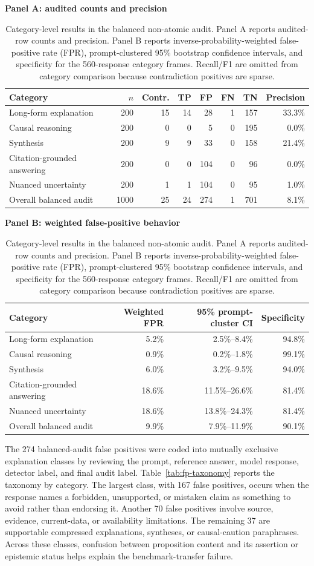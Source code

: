 \documentclass[11pt]{article}
\begin{document}
\begin{table}[H]
\centering
\small
\caption{Category-level results in the balanced non-atomic audit. Panel A reports audited-row counts and precision. Panel B reports inverse-probability-weighted false-positive rate (FPR), prompt-clustered 95\% bootstrap confidence intervals, and specificity for the 560-response category frames. Recall/F1 are omitted from category comparison because contradiction positives are sparse.}
\label{tab:enhanced-category-breakdown}
\textbf{Panel A: audited counts and precision}\\[0.25em]
\begin{tabular}{lrrrrrrr}
\toprule
Category & $n$ & Contr. & TP & FP & FN & TN & Precision\\
\midrule
Long-form explanation & 200 & 15 & 14 & 28 & 1 & 157 & 33.3\%\\
Causal reasoning & 200 & 0 & 0 & 5 & 0 & 195 & 0.0\%\\
Synthesis & 200 & 9 & 9 & 33 & 0 & 158 & 21.4\%\\
Citation-grounded answering & 200 & 0 & 0 & 104 & 0 & 96 & 0.0\%\\
Nuanced uncertainty & 200 & 1 & 1 & 104 & 0 & 95 & 1.0\%\\
\midrule
Overall balanced audit & 1000 & 25 & 24 & 274 & 1 & 701 & 8.1\%\\
\bottomrule
\end{tabular}

\vspace{0.6em}
\textbf{Panel B: weighted false-positive behavior}\\[0.25em]
\begin{tabular}{lrrr}
\toprule
Category & Weighted FPR & 95\% prompt-cluster CI & Specificity\\
\midrule
Long-form explanation & 5.2\% & 2.5\%--8.4\% & 94.8\%\\
Causal reasoning & 0.9\% & 0.2\%--1.8\% & 99.1\%\\
Synthesis & 6.0\% & 3.2\%--9.5\% & 94.0\%\\
Citation-grounded answering & 18.6\% & 11.5\%--26.6\% & 81.4\%\\
Nuanced uncertainty & 18.6\% & 13.8\%--24.3\% & 81.4\%\\
\midrule
Overall balanced audit & 9.9\% & 7.9\%--11.9\% & 90.1\%\\
\bottomrule
\end{tabular}
\end{table}

The 274 balanced-audit false positives were coded into mutually exclusive explanation classes by reviewing the prompt, reference answer, model response, detector label, and final audit label. Table~\ref{tab:fp-taxonomy} reports the taxonomy by category. The largest class, with 167 false positives, occurs when the response names a forbidden, unsupported, or mistaken claim as something to avoid rather than endorsing it. Another 70 false positives involve source, evidence, current-data, or availability limitations. The remaining 37 are supportable compressed explanations, syntheses, or causal-caution paraphrases. Across these classes, confusion between proposition content and its assertion or epistemic status helps explain the benchmark-transfer failure.
\end{document}
